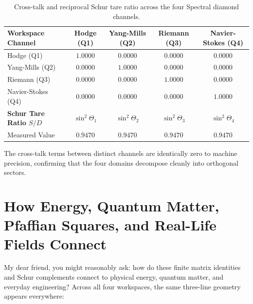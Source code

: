 \documentclass[11pt,a4paper]{article}
\theoremstyle{definition}
\begin{document}
\begin{table}[h]
\centering
\small
\begin{tabular}{lcccc}
\toprule
\textbf{Workspace Channel} & \textbf{Hodge (Q1)} & \textbf{Yang-Mills (Q2)} & \textbf{Riemann (Q3)} & \textbf{Navier-Stokes (Q4)} \\
\midrule
Hodge (Q1) & $1.0000$ & $0.0000$ & $0.0000$ & $0.0000$ \\
Yang-Mills (Q2) & $0.0000$ & $1.0000$ & $0.0000$ & $0.0000$ \\
Riemann (Q3) & $0.0000$ & $0.0000$ & $1.0000$ & $0.0000$ \\
Navier-Stokes (Q4) & $0.0000$ & $0.0000$ & $0.0000$ & $1.0000$ \\
\midrule
\textbf{Schur Tare Ratio $S/D$} & $\sin^2\Theta_1$ & $\sin^2\Theta_2$ & $\sin^2\Theta_3$ & $\sin^2\Theta_4$ \\
Measured Value & $0.9470$ & $0.9470$ & $0.9470$ & $0.9470$ \\
\bottomrule
\end{tabular}
\caption{Cross-talk and reciprocal Schur tare ratio across the four Spectral diamond channels.}
\label{tab:quaternary_matrix}
\end{table}

The cross-talk terms between distinct channels are identically zero to machine precision, confirming that the four domains decompose cleanly into orthogonal sectors.


\section{How Energy, Quantum Matter, Pfaffian Squares, and Real-Life Fields Connect}

My dear friend, you might reasonably ask: how do these finite matrix identities and Schur complements connect to physical energy, quantum matter, and everyday engineering? Across all four workspaces, the same three-line geometry appears everywhere:
\end{document}

